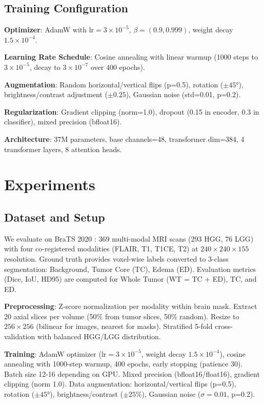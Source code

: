 \documentclass[runningheads]{llncs}
\begin{document}
\subsection{Training Configuration}

\textbf{Optimizer}: AdamW with $\text{lr}=3\times10^{-5}$, $\beta=(0.9, 0.999)$, weight decay $1.5\times10^{-4}$.

\textbf{Learning Rate Schedule}: Cosine annealing with linear warmup (1000 steps to $3\times10^{-5}$, decay to $3\times10^{-7}$ over 400 epochs).

\textbf{Augmentation}: Random horizontal/vertical flips (p=0.5), rotation ($\pm45°$), brightness/contrast adjustment ($\pm0.25$), Gaussian noise (std=0.01, p=0.2).

\textbf{Regularization}: Gradient clipping (norm=1.0), dropout (0.15 in encoder, 0.3 in classifier), mixed precision (bfloat16).

\textbf{Architecture}: 37M parameters, base channels=48, transformer dim=384, 4 transformer layers, 8 attention heads.

%
%
\section{Experiments}

\subsection{Dataset and Setup}

We evaluate on BraTS 2020 \cite{menze2015brats,bakas2018brats}: 369 multi-modal MRI scans (293 HGG, 76 LGG) with four co-registered modalities (FLAIR, T1, T1CE, T2) at $240 \times 240 \times 155$ resolution. Ground truth provides voxel-wise labels converted to 3-class segmentation: Background, Tumor Core (TC), Edema (ED). Evaluation metrics (Dice, IoU, HD95) are computed for Whole Tumor (WT = TC + ED), TC, and ED.

\textbf{Preprocessing}: Z-score normalization per modality within brain mask. Extract 20 axial slices per volume (50\% from tumor slices, 50\% random). Resize to $256 \times 256$ (bilinear for images, nearest for masks). Stratified 5-fold cross-validation with balanced HGG/LGG distribution.

\textbf{Training}: AdamW optimizer ($\text{lr}=3\times10^{-5}$, weight decay $1.5\times10^{-4}$), cosine annealing with 1000-step warmup, 400 epochs, early stopping (patience 30). Batch size 12-16 depending on GPU. Mixed precision (bfloat16/float16), gradient clipping (norm 1.0). Data augmentation: horizontal/vertical flips (p=0.5), rotation ($\pm45°$), brightness/contrast ($\pm25\%$), Gaussian noise ($\sigma=0.01$, p=0.2).
\end{document}
